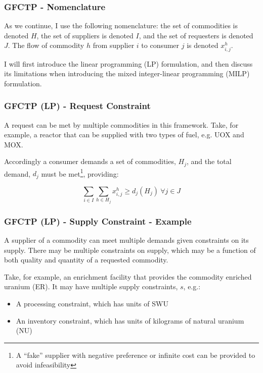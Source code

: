 \begin{frame}[ctb!]
  \frametitle{GFCTP - Nomenclature}

  As we continue, I use the following nomenclature: the set of commodities is
  denoted $H$, the set of suppliers is denoted $I$, and the set of requesters is
  denoted $J$. The flow of commodity $h$ from supplier $i$ to consumer $j$ is
  denoted $x^h_{i,j}$.\vspace{0.2cm}

  I will first introduce the linear programming (LP) formulation, and then
  discuss its limitations when introducing the mixed integer-linear programming
  (MILP) formulation.

\end{frame}

\begin{frame}[ctb!]
  \frametitle{GFCTP (LP) - Request Constraint}
  
  A request can be met by multiple commodities in this framework. Take, for
  example, a reactor that can be supplied with two types of fuel, e.g. UOX and
  MOX.\vspace{0.2cm}

  Accordingly a consumer demands a set of commodities, $H_j$, and the total
  demand, $d_j$ must be met\footnote{A ``fake'' supplier with negative
    preference or infinite cost can be provided to avoid infeasibility},
  providing:

  \begin{equation}
    \sum_{i \in I}\sum_{h \in H_{j}} x_{i,j}^{h} \geq d_{j}(H_{j})  \: \forall j \in J
  \end{equation}
  
\end{frame}

\begin{frame}[ctb!]
  \frametitle{GFCTP (LP) - Supply Constraint - Example}
  
  A supplier of a commodity can meet multiple demands given constraints on its
  supply. There may be multiple constraints on supply, which may be a function
  of both quality and quantity of a requested commodity.\vspace{0.2cm}

  Take, for example, an enrichment facility that provides the commodity enriched
  uranium (ER). It may have multiple supply constraints, $s$, e.g.:
  \begin{itemize}
    \item A processing constraint, which has units of SWU
    \item An inventory constraint, which has units of kilograms of natural
      uranium (NU)
  \end{itemize}

\end{frame}


